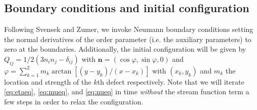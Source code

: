 \documentclass[reqno]{article}
\begin{document}
	\subsection{Boundary conditions and initial configuration}
	Following Svensek and Zumer, we invoke Neumann boundary conditions setting the normal derivatives of the order parameter (i.e. the auxiliary parameters) to zero at the boundaries. Additionally, the initial configuration will be given by $Q_{ij} = 1/2(3n_in_j - \delta_{ij})$ with $\mathbf{n} = (\cos\varphi, \sin\varphi, 0)$ and $\varphi = \sum_{k=1}^2 m_k\arctan\left[ (y - y_k)/(x - x_k) \right]$ with $(x_k, y_k)$ and $m_k$ the location and strength of the $k$th defect respectively. Note that we will iterate \eqref{eq:etaeq}, \eqref{eq:mueq}, and \eqref{eq:nueq} in time \textit{without} the stream function term a few steps in order to relax the configuration. 
	
\end{document}
